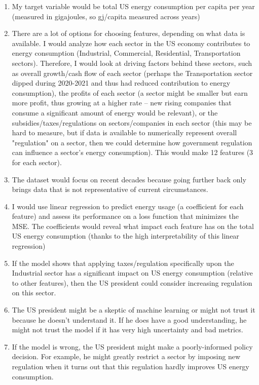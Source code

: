 \documentclass[submit]{harvardml}
\begin{document}
\begin{solution}[Impact]

  \noindent 
  \begin{enumerate}
    \item My target variable would be total US energy consumption per capita per year
    (measured in gigajoules, so gj/capita measured across years)
    \item There are a lot of options for choosing features, depending on
    what data is available. I would analyze how each sector in the
    US economy contributes to energy consumption (Industrial, Commercial, Residential, Transportation sectors).
    Therefore, I would look at driving factors behind these sectors, such as
    overall growth/cash flow of each sector (perhaps the Transportation sector dipped during
    2020-2021 and thus had reduced contribution to energy consumption), the profits of
    each sector (a sector might be smaller but earn more profit, thus growing at a higher rate – 
    new rising companies that consume a significant amount of energy would be relevant),
    or the subsidies/taxes/regulations on sectors/companies in each sector (this may be hard to measure, but 
    if data is available to numerically represent overall "regulation" on a sector, then we could determine 
    how government regulation can influence a sector's energy consumption). This would make 12 features (3 for each sector).
    \item The dataset would focus on recent decades because going further back
    only brings data that is not representative of current circumstances.
    \item I would use linear regression to predict energy usage (a coefficient for each feature) and assess
    its performance on a loss function that minimizes the MSE. The coefficients would
    reveal what impact each feature has on the total US energy consumption (thanks
    to the high interpretability of this linear regression)
    \item If the model shows that applying taxes/regulation specifically upon the Industrial
    sector has a significant impact on US energy consumption (relative to other features), 
    then the US president could consider increasing regulation on
    this sector. 
    \item The US president might be a skeptic of machine learning or might not
    trust it because he doesn't understand it. If he does have a good understanding,
    he might not trust the model if it has very high uncertainty and bad metrics.
    \item If the model is wrong, the US president might make a poorly-informed 
    policy decision. For example, he might greatly restrict a sector by imposing 
    new regulation when it turns out that this regulation hardly improves 
    US energy consumption. 
  \end{enumerate}
\end{solution}
\end{document}
